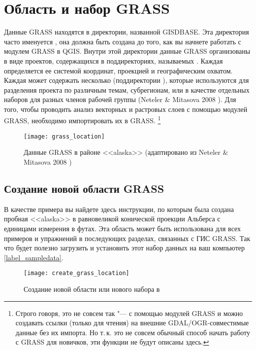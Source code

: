 \section{Область и набор GRASS}\label{sec:about_loc}

Данные GRASS находятся в директории, названной GISDBASE. Эта директория
часто именуется , она должна быть создана до того,
как вы начнете работать с модулем GRASS в QGIS. Внутри этой директории
данные GRASS организованы в виде проектов, содержащихся в поддиректориях,
называемых . Каждая  определяется
ее системой координат, проекцией и географическим охватом. Каждая
 может содержать несколько 
(поддиректории ), которые используются для разделения
проекта по различным темам, субрегионам, или в качестве отдельных
наборов для разных членов рабочей группы (Neteler \& Mitasova 2008
\cite{neteler_mitasova08}). Для того, чтобы проводить анализ векторных
и растровых слоев с помощью модулей GRASS, необходимо импортировать их
в  GRASS.
\footnote{Строго говоря, это не совсем так "--- с помощью модулей GRASS
 и  можно создавать ссылки
(только для чтения) на внешние GDAL/OGR-совместимые данные без их
импорта. Но т.\,к. это не совсем обычный способ начать работу с GRASS
для новичков, эти функции не будут описаны здесь.}


\begin{figure}[ht]
\centering
\texttt{[image: grass\_location]}
\caption{Данные GRASS в районе <<alaska>> (адаптировано из Neteler \& Mitasova 2008 \cite{neteler_mitasova08})}\label{fig:grass_location}\end{figure}

\subsection{Создание новой области GRASS}\label{sec:create_loc}

В качестве примера вы найдете здесь инструкции, по которым была создана
пробная  <<alaska>> в равновеликой конической проекции
Альберса с единицами измерения в футах. Эта область может быть использована
для всех примеров и упражнений в последующих разделах, связанных с ГИС
GRASS. Так что будет полезно загрузить и установить этот набор данных на ваш
компьютер \ref{label_sampledata}.

\begin{figure}[ht]
\centering
\texttt{[image: create\_grass\_location]}
\caption{Создание новой области \grass или нового набора в \qg \wincaption}
\label{fig:create_grass_location}
\end{figure}

